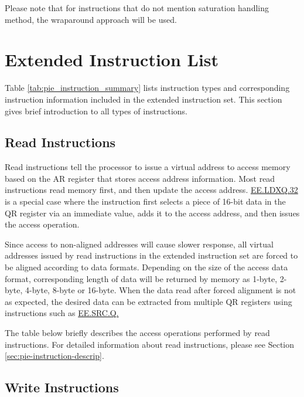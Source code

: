 \documentclass[main\_\_EN.tex]{subfiles}
\begin{document}
Please note that for instructions that do not mention saturation handling method, the wraparound approach will be used.

\section{Extended Instruction List}\label{chp:pie_instruction_simple_introduction}

Table \ref{tab:pie_instruction_summary} lists instruction types and corresponding instruction information included in the extended instruction set. This section gives brief introduction to all types of instructions.


\clearpage


\subsection{Read Instructions}

\label{sec:pie-load-instrucitons}

Read instructions tell the processor to issue a virtual address to access memory based on the AR register that stores access address information. Most read instructions read memory first, and then update the access address. \hyperref[instruction:EELDXQ32]{EE.LDXQ.32} is a special case where the instruction first selects a piece of 16-bit data in the QR register via an immediate value, adds it to the access address, and then issues the access operation.

Since access to non-aligned addresses will cause slower response, all virtual addresses issued by read instructions in the extended instruction set are forced to be aligned according to data formats. Depending on the size of the access data format, corresponding length of data will be returned by memory as 1-byte, 2-byte, 4-byte, 8-byte or 16-byte. When the data read after forced alignment is not as expected, the desired data can be extracted from multiple QR registers using instructions such as \hyperref[instruction:EESRCQ]{EE.SRC.Q.}

The table below briefly describes the access operations performed by read instructions. For detailed information about read instructions, please see Section \ref{sec:pie-instruction-descrip}.

\clearpage


\subsection{Write Instructions}
\label{sec:pie-write-instrucitons}
\end{document}
